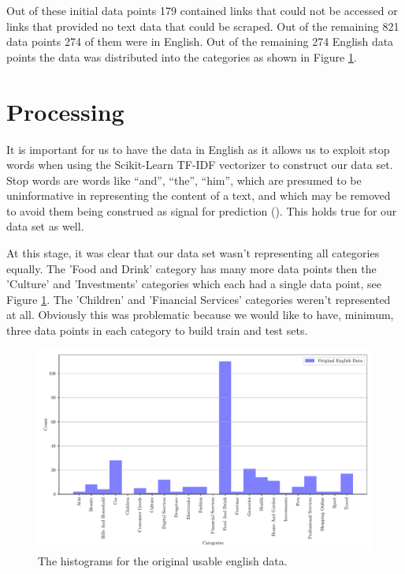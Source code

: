 Out of these initial data points 179 contained links that could not be accessed or links that provided no text data that could be scraped. Out of the remaining 821 data points 274 of them were in English. Out of the remaining 274 English data points the data was distributed into the categories as shown in Figure \ref{fig:original_english_counts}.

\section{Processing}

It is important for us to have the data in English as it allows us to exploit stop words when using the Scikit-Learn TF-IDF vectorizer to construct our data set. Stop words are words like “and”, “the”, “him”, which are presumed to be uninformative in representing the content of a text, and which may be removed to avoid them being construed as signal for prediction (\cite{sklearn62feature}). This holds true for our data set as well.

At this stage, it was clear that our data set wasn't representing all categories equally. The 'Food and Drink' category has many more data points then the 'Culture' and 'Investments' categories which each had a single data point, see Figure \ref{fig:original_english_counts}. The 'Children' and 'Financial Services' categories weren't represented at all. Obviously this was problematic because we would like to have, minimum, three data points in each category to build train and test sets.

\begin{figure}[!ht]
  \centering
  \includegraphics[width=\textwidth]{../img/plot_original_english_counts.pdf}
  \caption{The histograms for the original usable english data.}
  \label{fig:original_english_counts}
\end{figure}

